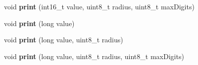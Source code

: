 \begin{DoxyCompactItemize}
\item 
void {\bfseries print} (int16\+\_\+t value, uint8\+\_\+t radius, uint8\+\_\+t max\+Digits)\hypertarget{class_l_k_m1638_board_aa272bb1dbb3efa68775183dce20900eb}{}\label{class_l_k_m1638_board_aa272bb1dbb3efa68775183dce20900eb}

\item 
void {\bfseries print} (long value)\hypertarget{class_l_k_m1638_board_a15473b5559176286ee1f91e157725c55}{}\label{class_l_k_m1638_board_a15473b5559176286ee1f91e157725c55}

\item 
void {\bfseries print} (long value, uint8\+\_\+t radius)\hypertarget{class_l_k_m1638_board_abd76f4879932dcafed65972c2ccefddb}{}\label{class_l_k_m1638_board_abd76f4879932dcafed65972c2ccefddb}

\item 
void {\bfseries print} (long value, uint8\+\_\+t radius, uint8\+\_\+t max\+Digits)\hypertarget{class_l_k_m1638_board_acf4c5b99e65c269e9871ac1cf96b2c24}{}\label{class_l_k_m1638_board_acf4c5b99e65c269e9871ac1cf96b2c24}

\end{DoxyCompactItemize}
